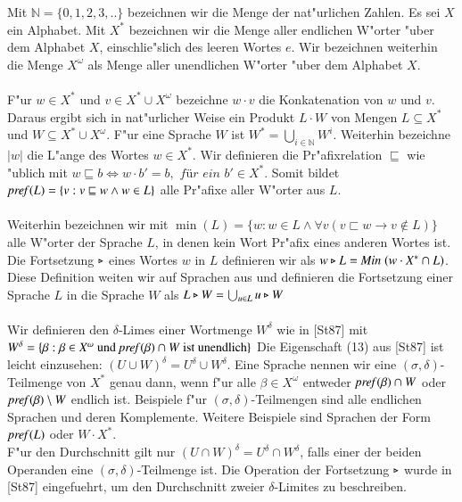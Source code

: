 Mit $\mathbb{N}=\{0,1,2,3,..\}$ bezeichnen wir die Menge der nat"urlichen Zahlen. Es sei $X$ ein Alphabet.
Mit $X^*$ bezeichnen wir die Menge aller endlichen W"orter "uber dem Alphabet $X$, einschlie"slich des leeren Wortes $e$.
Wir bezeichnen weiterhin die Menge $X^\omega$ als Menge aller unendlichen W"orter "uber dem Alphabet $X$.\\\\
F"ur $w\in X^*$ und $v\in X^* \cup X^\omega$ bezeichne $w\cdot v$ die Konkatenation von $w$ und $v$. Daraus ergibt sich in nat"urlicher Weise ein Produkt $L\cdot W$ von Mengen $L\subseteq X^*$ und $W\subseteq X^*\cup X^\omega$.
F"ur eine Sprache $W$ ist $W^*=\bigcup_{i\in\mathbb{N}} W^i$. Weiterhin bezeichne $\vert w\vert$ die L"ange des Wortes $w\in X^*$.
Wir definieren die Pr"afixrelation $\sqsubseteq$ wie "ublich mit $w\sqsubseteq b \Leftrightarrow w\cdot b' = b,\textit{ f{\"u}r ein }b'\in X^*$.
Somit bildet $\mathit{pref{(}}L) = \{v:v\sqsubseteq w \wedge w\in L\}$ alle Pr"afixe aller W"orter aus $L$.\\\\
Weiterhin bezeichnen wir mit $\min(L) = \{w:w\in L \wedge \forall v( v\sqsubset w \to v\notin L)\}$ alle W"orter der Sprache $L$, in denen kein Wort Pr"afix eines anderen Wortes ist.
Die Fortsetzung $\triangleright$ eines Wortes $w$ in $L$ definieren wir als $w\triangleright L = \mathit{Min}\;(w\cdot X^* \cap L)$. Diese Definition weiten wir auf Sprachen aus und definieren
die Fortsetzung einer Sprache $L$ in die Sprache $W$ als $L\triangleright W = \bigcup_{u\in L} u\triangleright W$\\\\
Wir definieren den $\delta$-Limes einer Wortmenge $W ^\delta$ wie in [St87] mit\\$W^\delta = \{\beta : \beta \in X^\omega \text{ und }\mathit{pref{(}}\beta)\cap W \text{ ist unendlich}\}$
Die Eigenschaft (13) aus [St87] ist leicht einzusehen: $(U \cup W)^\delta = U^\delta \cup W^\delta$.	Eine Sprache nennen wir eine $(\sigma,\delta)$-Teilmenge von $X^*$ genau dann, wenn f"ur alle $\beta \in X^\omega$ entweder $\mathit{pref{(}}\beta)\cap W$ oder $\mathit{pref{(}}\beta)\setminus W$ endlich ist.
Beispiele f"ur $(\sigma,\delta)$-Teilmengen sind alle endlichen Sprachen und deren Komplemente. Weitere Beispiele sind Sprachen der Form $\mathit{pref{(}}L)$ oder $W\cdot X^*$.\\
F"ur den Durchschnitt gilt nur $(U\cap W)^\delta = U^\delta \cap W^\delta$, falls einer der beiden Operanden eine $(\sigma,\delta)$-Teilmenge ist.
Die Operation der Fortsetzung $\triangleright$ wurde in [St87] eingefuehrt, um den Durchschnitt zweier $\delta$-Limites zu beschreiben.
